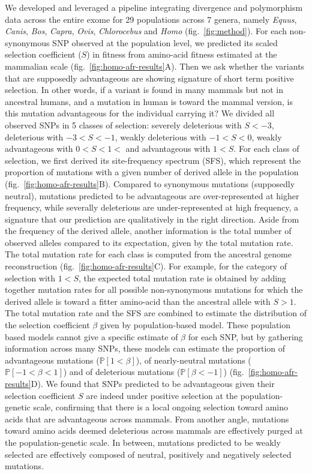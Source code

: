 \documentclass{article}
\newcommand{\proba}{\mathbb{P}}
\newcommand{\Spop}{\beta}
\newcommand{\Sphy}{S}
\newcommand{\polyDel}{\proba \left[ {\Spop < -1} \right]}
\newcommand{\polyNeutral}{\proba \left[ -1 < \Spop < 1 \right]}
\newcommand{\polyAdv}{\proba \left[ 1 < \Spop  \right]}
\begin{document}
    We developed and leveraged a pipeline integrating divergence and polymorphism data across the entire exome for 29 populations across 7 genera, namely \textit{Equus}, \textit{Canis}, \textit{Bos}, \textit{Capra}, \textit{Ovis}, \textit{Chlorocebus} and \textit{Homo} (fig.~\ref{fig:method}).
    For each non-synonymous SNP observed at the population level, we predicted its scaled selection coefficient ($\Sphy$) in fitness from amino-acid fitness estimated at the mammalian scale (fig.~\ref{fig:homo-afr-results}A).
    Then we ask whether the variants that are supposedly advantageous are showing signature of short term positive selection.
    In other words, if a variant is found in many mammals but not in ancestral humans, and a mutation in human is toward the mammal version, is this mutation advantageous for the individual carrying it?
    We divided all observed SNPs in 5 classes of selection: severely deleterious with $\Sphy<-3$, deleterious with $-3<\Sphy<-1$, weakly deleterious with $-1<\Sphy<0$, weakly advantageous with $0<\Sphy<1<$ and advantageous with $1<\Sphy$.
    For each class of selection, we first derived its site-frequency spectrum (SFS), which represent the proportion of mutations with a given number of derived allele in the population (fig.~\ref{fig:homo-afr-results}B).
    Compared to synonymous mutations (supposedly neutral), mutations predicted to be advantageous are over-represented at higher frequency, while severally deleterious are under-represented at high frequency, a signature that our prediction are qualitatively in the right direction.
    Aside from the frequency of the derived allele, another information is the total number of observed alleles compared to its expectation, given by the total mutation rate.
    The total mutation rate for each class is computed from the ancestral genome reconstruction (fig.~\ref{fig:homo-afr-results}C).
    For example, for the category of selection with $1<\Sphy$, the expected total mutation rate is obtained by adding together mutation rates for all possible non-synonymous mutations for which the derived allele is toward a fitter amino-acid than the ancestral allele with $\Sphy > 1$.
    The total mutation rate and the SFS are combined to estimate the distribution of the selection coefficient $\Spop$ given by population-based model\cite{tataru_inference_2017, tataru_polydfe_2020}.
    These population based models cannot give a specific estimate of $\Spop$ for each SNP, but by gathering information across many SNPs, these models can estimate the proportion of advantageous mutations ($\polyAdv$), of nearly-neutral mutations ($\polyNeutral$) and of deleterious mutations ($\polyDel$) (fig.~\ref{fig:homo-afr-results}D).
    We found that SNPs predicted to be advantageous given their selection coefficient $\Sphy$ are indeed under positive selection at the population-genetic scale, confirming that there is a local ongoing selection toward amino acids that are advantageous across mammals.
    From another angle, mutations toward amino acids deemed deleterious across mammals are effectively purged at the population-genetic scale.
    In between, mutations predicted to be weakly selected are effectively composed of neutral, positively and negatively selected mutations.
\end{document}
